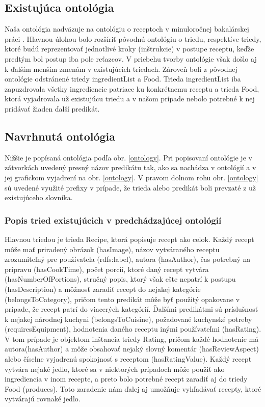 \subsection{Existujúca ontológia}
	Naša ontológia nadväzuje na ontológiu o receptoch v minuloročnej bakalárskej práci \cite{bakalarka}. Hlavnou úlohou bolo rozšíriť pôvodnú ontológiu o triedu, respektíve triedy, ktoré budú reprezentovať jednotlivé kroky (inštrukcie) v postupe receptu, keďže predtým bol postup iba pole reťazcov. V priebehu tvorby ontológie však došlo aj k ďalším menším zmenám v existujúcich triedach. Zároveň boli z pôvodnej ontológie odstránené triedy ingredientList a Food. Trieda ingredientList iba zapuzdrovala všetky ingrediencie patriace ku konkrétnemu receptu a trieda Food, ktorá vyjadrovala už existujúcu triedu a v našom prípade nebolo potrebné k nej pridávať žiaden ďalší predikát.
	
\subsection{Navrhnutá ontológia}
Nižšie je popísaná ontológia podľa obr. \ref{ontology}. Pri popisovaní ontológie je v zátvorkách uvedený presný názov predikátu tak, ako sa nachádza v ontológií a v jej grafickom vyjadrení na obr. \ref{ontology}. V pravom dolnom rohu obr. \ref{ontology} sú uvedené využité prefixy v prípade, že trieda alebo predikát boli prevzaté z už existujúceho slovníka. 
	
\subsubsection{Popis tried existujúcich v predchádzajúcej ontológií}
	Hlavnou triedou je trieda Recipe, ktorá popisuje recept ako celok. Každý recept môže mať priradený obrázok (hasImage), názov vytváraného receptu zrozumiteľný pre používateľa (rdfs:label), autora (hasAuthor), čas potrebný na prípravu (hasCookTime), počet porcií, ktoré daný recept vytvára (hasNumberOfPortions), stručný popis, ktorý však ešte nepatrí k postupu (hasDescription) a môžnosť zaradiť recept do nejakej kategórie (belongsToCategory), pričom tento predikát môže byť použitý opakovane v prípade, že recept patrí do viacerých kategórií. Ďalšími predikátmi sú príslušnosť k nejakej národnej kuchyni (belongsToCuisine), požadované kuchynské potreby (requiresEquipment), hodnotenia daného receptu inými používateľmi (hasRating). V tom prípade je objektom inštancia triedy Rating, pričom každé hodnotenie má autora(hasAuthor) a môže obsahovať nejaký slovný komentár (hasReviewAspect) alebo číselne vyjadrenú spokojnosť s receptom (hasRatingValue). Každý recept vytvára nejaké jedlo, ktoré sa v niektorých prípadoch môže použiť ako ingrediencia v inom recepte, a preto bolo potrebné recept zaradiť aj do triedy Food (produces). Toto zaradenie nám ďalej aj umožňuje vyhľadávať recepty, ktoré vytvárajú rovnaké jedlo.
	
